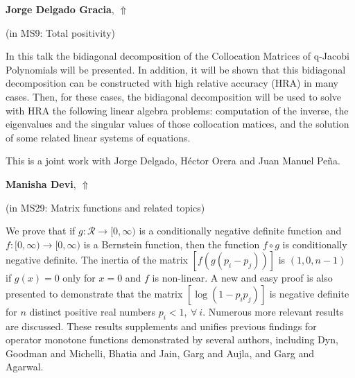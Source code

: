 \documentclass[ILAS2025-program.tex]{subfiles}
\begin{document}
\hypertarget{down0043}{}\begin{ilasabstract}
    
\textbf{Jorge Delgado Gracia},  \hfill \hyperlink{up0043}{$\Uparrow$}
    
    
(in {\color{mstitle}MS9: Total positivity})
        
\mtskip
    In this talk the bidiagonal decomposition of the Collocation Matrices of q-Jacobi Polynomials will be presented.
In addition, it will be shown that this bidiagonal decomposition can be constructed with high relative accuracy (HRA)
in many cases.
Then, for these cases, the bidiagonal decomposition will be used to solve with HRA the following linear algebra
problems: computation of the inverse, the eigenvalues and the singular values of those collocation matices, and
the solution of some related linear systems of equations.

This is a joint work with Jorge Delgado, Héctor Orera and Juan Manuel Peña.
\end{ilasabstract}
    

\hypertarget{down0047}{}\begin{ilasabstract}
    
\textbf{Manisha Devi},  \hfill \hyperlink{up0047}{$\Uparrow$}
    
    
(in {\color{mstitle}MS29: Matrix functions and related topics})
        
\mtskip
    We prove that if $g:\mathcal{R}\rightarrow[0,\infty)$ is a conditionally negative definite function and $f:[0,\infty)\rightarrow[0,\infty)$ is a Bernstein function, then the function $f\circ g$ is conditionally negative definite. The inertia of the matrix $[f(g(p_i-p_j))]$ is $(1,0,n-1)$ if $g(x)=0$ only for $x=0$ and $f$ is non-linear. A new and easy proof is also presented to demonstrate that the matrix $[\log(1-p_ip_j)]$ is negative definite for $n$ distinct positive real numbers $p_i<1, ~\forall~i$. Numerous more relevant results are discussed. These results supplements and unifies previous findings for operator monotone functions demonstrated by several authors, including Dyn, Goodman and Michelli, Bhatia and Jain, Garg and Aujla, and Garg and Agarwal.
\end{ilasabstract}
    
\end{document}

